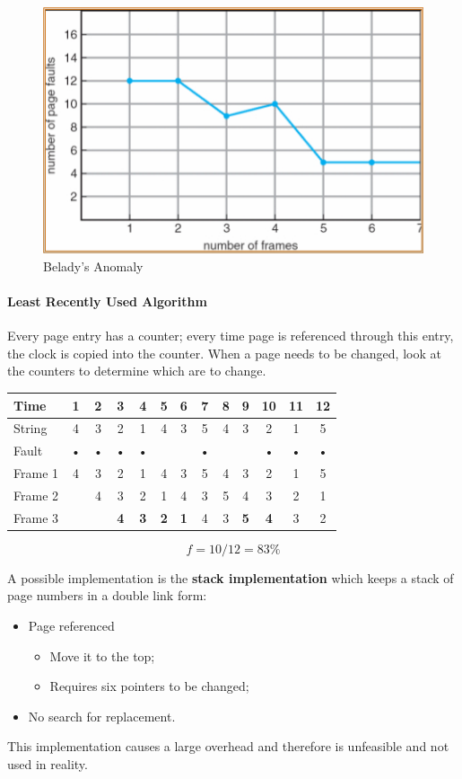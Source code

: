 \begin{figure}[hbtp]
\centering
\includegraphics[scale=0.4]{images/virtual_memory/belady_anomaly.jpg}
\caption{Belady's Anomaly}
\end{figure}

\paragraph{Least Recently Used Algorithm}
Every page entry has a counter; every time page is referenced through this entry, the clock is copied into the counter. When a page needs to be changed, look at the counters to determine which are to change.

\begin{center}
\begin{tabular}{l|cccccccccccc}
\hline
Time & 1 & 2 & 3 & 4 & 5 & 6 & 7 & 8 & 9 & 10 & 11 & 12 \\
\hline
String & 4 & 3 & 2 & 1 & 4 & 3 & 5 & 4 & 3 & 2 & 1 & 5 \\
\hline
Fault & • & • & • & • & & & • & & & • & • & • \\
\hline
Frame 1 & 4 & 3 & 2 & 1 & 4 & 3 & 5 & 4 & 3 & 2 & 1 & 5 \\
Frame 2 & & 4 & 3 & 2 & 1 & 4 & 3 & 5 & 4 & 3 & 2 & 1 \\
Frame 3 & & & \textbf{4} & \textbf{3} & \textbf{2} & \textbf{1} & 4 & 3 & \textbf{5} & \textbf{4} & 3 & 2 \\
\hline
\end{tabular}
\[ f = 10/12 = 83 \% \]
\end{center}

A possible implementation is the \textbf{stack implementation} which keeps a stack of page numbers in a double link form:
\begin{itemize}
\item Page referenced
\begin{itemize}
\item Move it to the top;
\item Requires six pointers to be changed;
\end{itemize}
\item No search for replacement.
\end{itemize}
This implementation causes a large overhead and therefore is unfeasible and not used in reality.


